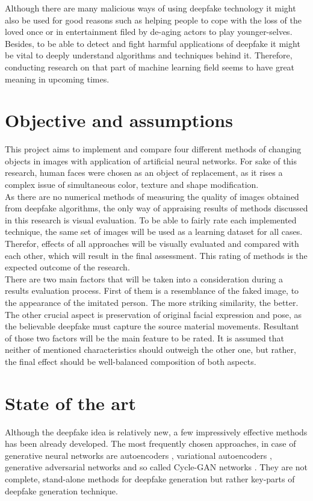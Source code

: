 Although there are many malicious ways of using deepfake technology it might also be used for good reasons such as helping people to cope with the loss of the loved once or in entertainment filed by de-aging actors to play younger-selves. Besides, to be able to detect and fight harmful applications of deepfake it might be vital to deeply understand algorithms  and techniques behind it. Therefore, conducting research on that part of machine learning field seems to have great meaning in upcoming times.

\section{Objective and assumptions}
\label{Objective and assumptions}
This project aims to implement and compare four different methods of changing objects in images with application of artificial neural networks. For sake of this research, human faces were chosen as an object of replacement, as it rises a complex issue of simultaneous color, texture and shape modification.\\

As there are no numerical methods of measuring the quality of images obtained from deepfake algorithms, the only way of appraising results of methods discussed in this research is visual evaluation. To be able to fairly rate each implemented technique, the same set of images will be used as a learning dataset for all cases. Therefor, effects of all approaches will be visually evaluated and compared with each other, which will result in the final assessment. This rating of methods is the expected outcome of the research.\\

There are two main factors that will be taken into a consideration during a results evaluation process. First of them is a resemblance of the faked image, to the appearance of the imitated person. The more striking similarity, the better. The other crucial aspect is preservation of original facial expression and pose, as the believable deepfake must capture the source material movements. Resultant of those two factors will be the main feature to be rated. It is assumed that neither of mentioned characteristics should outweigh the other one, but rather, the final effect should be well-balanced composition of both aspects.

\section{State of the art}
Although the deepfake idea is relatively new, a few impressively effective methods has been already developed. The most frequently chosen approaches, in case of generative neural networks are autoencoders \cite{autoencoders_bib}, variational autoencoders \cite{variational_bayes_bib} \cite{vae_loss_bib}, generative adversarial networks \cite{autoencoding_beyond_pixels_bib} \cite{U_GAT_IT_bib} and so called Cycle-GAN networks \cite{cycleGAN_1_bib} \cite{cycleGAN_2_bib} \cite{cycleGAN_3_bib}. They are not complete, stand-alone methods for deepfake generation but rather key-parts of deepfake generation technique.\\

